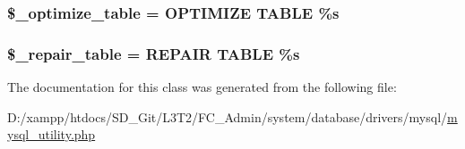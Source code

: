 \subsubsection[{\$\+\_\+optimize\+\_\+table}]{\setlength{\rightskip}{0pt plus 5cm}\$\+\_\+optimize\+\_\+table = \textquotesingle{}O\+P\+T\+I\+M\+I\+Z\+E T\+A\+B\+L\+E \%s\textquotesingle{}\hspace{0.3cm}{\ttfamily [protected]}}\label{class_c_i___d_b__mysql__utility_a083199e5c22c78912dae0a47bb2d7fad}
\hypertarget{class_c_i___d_b__mysql__utility_a5cf925cbd52e3f6ba5b7ada3fa436efc}{}
\subsubsection[{\$\+\_\+repair\+\_\+table}]{\setlength{\rightskip}{0pt plus 5cm}\$\+\_\+repair\+\_\+table = \textquotesingle{}R\+E\+P\+A\+I\+R T\+A\+B\+L\+E \%s\textquotesingle{}\hspace{0.3cm}{\ttfamily [protected]}}\label{class_c_i___d_b__mysql__utility_a5cf925cbd52e3f6ba5b7ada3fa436efc}


The documentation for this class was generated from the following file\+:\begin{DoxyCompactItemize}
\item 
D\+:/xampp/htdocs/\+S\+D\+\_\+\+Git/\+L3\+T2/\+F\+C\+\_\+\+Admin/system/database/drivers/mysql/\hyperlink{mysql__utility_8php}{mysql\+\_\+utility.\+php}\end{DoxyCompactItemize}
